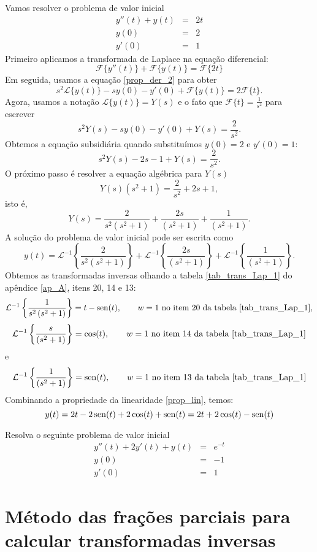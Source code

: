 \begin{ex}Vamos resolver o problema de valor inicial
\begin{eqnarray*}
 y''(t)+y(t)&=&2t\\
y(0)&=&2\\
y'(0)&=&1
\end{eqnarray*}
Primeiro aplicamos a transformada de Laplace na equação diferencial:
 $$
 \mathcal{F}\{y''(t)\}+\mathcal{F}\{y(t)\}=\mathcal{F}\{2t\}
 $$
 Em seguida, usamos a equação \ref{prop_der_2} para obter
 $$
s^2 \mathcal{L }\{ y(t)\}-sy(0)-y'(0)+\mathcal{F}\{y(t)\}=2\mathcal{F}\{t\}.
 $$
 Agora, usamos a notação $\mathcal{L }\{ y(t)\}=Y(s)$ e o fato que $\mathcal{F}\{t\}=\frac{1}{s^2}$ para escrever
 $$
s^2 Y(s)-sy(0)-y'(0)+Y(s)=\frac{2}{s^2}.
 $$
 Obtemos a equação subsidiária quando substituímos $y(0)=2$ e $y'(0)=1$:
 $$
s^2 Y(s)-2s-1+Y(s)=\frac{2}{s^2}.
 $$
 O próximo passo é resolver a equação algébrica para $Y(s)$
 $$
 Y(s)\left(s^2+1\right)=\frac{2}{s^2}+2s+1,
 $$
 isto é,
 $$
 Y(s)=\frac{2}{s^2\left(s^2+1\right)}+\frac{2s}{\left(s^2+1\right)}+\frac{1}{\left(s^2+1\right)}.
 $$
 A solução do problema de valor inicial pode ser escrita como
$$
y(t)=\mathcal{L}^{-1}\left\{\frac{2}{s^2\left(s^2+1\right)}\right\}+\mathcal{L}^{-1}\left\{\frac{2s}{\left(s^2+1\right)}\right\}+\mathcal{L}^{-1}\left\{\frac{1}{\left(s^2+1\right)}\right\}.
$$
 Obtemos as transformadas inversas olhando a tabela \ref{tab_trans_Lap_1} do apêndice \ref{ap_A}, itens 20, 14 e 13:
 $$
 \mathcal{L}^{-1}\left\{\frac{1}{s^2\left(s^2+1\right)}\right\}=t-\operatorname{sen}(t),\qquad w=1\ \hbox{no item 20 da tabela \ref{tab_trans_Lap_1}}, $$
 $$
 \mathcal{L}^{-1}\left\{\frac{s}{\left(s^2+1\right)}\right\}=\cos(t),\qquad w=1\ \hbox{no item 14 da tabela \ref{tab_trans_Lap_1}}
 $$
 e
 $$
 \mathcal{L}^{-1}\left\{\frac{1}{\left(s^2+1\right)}\right\}=\operatorname{sen}(t),\qquad w=1\ \hbox{no item 13 da tabela \ref{tab_trans_Lap_1}}
 $$
 Combinando a propriedade da linearidade \ref{prop_lin}, temos:
 $$
y(t)=2t-2\operatorname{sen}(t)+2\cos(t)+\operatorname{sen}(t)=2t+2\cos(t)-\operatorname{sen}(t)
$$
 \end{ex}
\begin{prob}Resolva o seguinte problema de valor inicial
\begin{eqnarray*}
 y''(t)+2y'(t)+y(t)&=&e^{-t}\\
y(0)&=&-1\\
y'(0)&=&1
\end{eqnarray*}
\end{prob}
\section{Método das frações parciais para calcular transformadas inversas}

